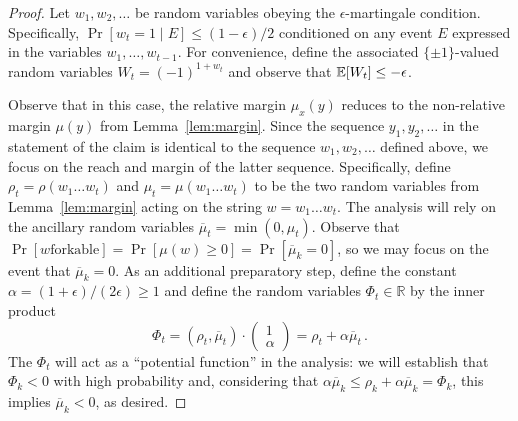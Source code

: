 \begin{proof}
  Let $w_1, w_2, \ldots$ be random variables obeying the
  $\epsilon$-martingale condition.  Specifically,
  $\Pr[w_t = 1 \mid E] \leq (1 - \epsilon)/2$ conditioned on any event
  $E$ expressed in the variables $w_1, \ldots, w_{t-1}$.  For
  convenience, define the associated $\{\pm1\}$-valued random
  variables $W_t = (-1)^{1+w_t}$ and observe that
  $\operatorname{\mathbb{E}}[W_t] \leq -\epsilon$.

Observe that in this case, the relative margin $\mu_x(y)$ reduces to 
the non-relative margin $\mu(y)$ from Lemma~\ref{lem:margin}. 
Since the sequence $y_1, y_2, \ldots$ in the statement of the claim 
is identical to the sequence $w_1, w_2, \ldots$ defined above, 
we focus on the reach and margin of the latter sequence. 
Specifically, define $\rho_t = \rho(w_1 \ldots w_t)$ and
$\mu_t = \mu(w_1 \ldots w_t)$ to be the two random variables from
Lemma~\ref{lem:margin} acting on the string $w=w_1 \ldots w_t$. The
analysis will rely on the ancillary random variables
$\overline{\mu}_t = \min(0,\mu_t)$.  Observe that $\Pr[\text{$w$
  forkable}] = \Pr[\mu(w) \geq 0] = \Pr[\overline{\mu}_k = 0]$, so we
may focus on the event that $\overline{\mu}_k = 0$. As an additional
preparatory step, define the constant
$\alpha = (1+\epsilon)/(2\epsilon) \geq 1$ and define the random
variables $\Phi_t \in \mathbb{R}$ by the inner product
  \[
    \Phi_t = (\rho_t, \overline{\mu}_t) \cdot
    \left(\begin{array}{c} 1\\ \alpha\end{array}\right) = \rho_t +
    \alpha \overline{\mu}_t\,.
  \]
  The $\Phi_t$ will act as a ``potential function'' in the analysis:
  we will establish that $\Phi_k < 0$ with high probability and,
  considering that
  $\alpha\overline{\mu}_k \leq \rho_k + \alpha \overline{\mu}_k =
  \Phi_k$, this implies $\overline{\mu}_k < 0$, as desired.
  

\end{proof}
